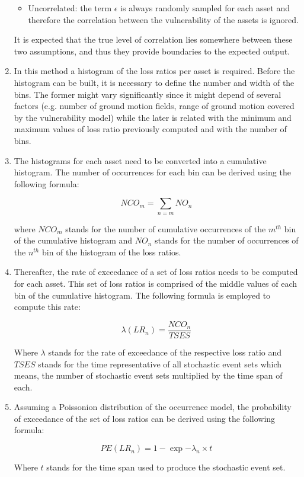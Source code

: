 \begin{enumerate}
\begin{itemize}
\item Uncorrelated: the term $\epsilon$ is always randomly sampled for each asset and therefore the correlation between the vulnerability of the assets is ignored.

\end{itemize}

It is expected that the true level of correlation lies somewhere between these two assumptions, and thus they provide boundaries to the expected output. 

\item In this method a histogram of the loss ratios per asset is required. Before the histogram can be built, it is necessary to define the number and width of the bins. The former might vary significantly since it might depend of several factors (e.g. number of ground motion fields, range of ground motion covered by the vulnerability model) while the later is related with the minimum and maximum values of loss ratio previously computed and with the number of bins. 

\item The histograms for each asset need to be converted into a cumulative histogram. The number of occurrences for each bin can be derived using the following formula:

\begin{equation}
NCO_m = \sum_{n=m} NO_n
\end{equation}

where $NCO_m$ stands for the number of cumulative occurrences of the $m^{th}$ bin of the cumulative histogram and $NO_n$ stands for the number of occurrences of the $n^{th}$ bin of the histogram of the loss ratios.

\item Thereafter, the rate of exceedance of a set of loss ratios needs to be computed for each asset. This set of loss ratios is comprised of the middle values of each bin of the cumulative histogram. The following formula is employed to compute this rate:

\begin{equation}
\lambda(LR_n) = \frac{NCO_n}{TSES}
\end{equation}

Where $\lambda$ stands for the rate of exceedance of the respective loss ratio and $TSES$ stands for the time representative of all stochastic event sets which means, the number of stochastic event sets multiplied by the time span of each.

\item Assuming a Poissonion distribution of the occurrence model, the probability of exceedance of the set of loss ratios can be derived using the following formula:

\begin{equation}
PE(LR_n) = 1-\exp{-\lambda_n\times t}
\end{equation}

Where $t$ stands for the time span used to produce the stochastic event set.

\end{enumerate}



